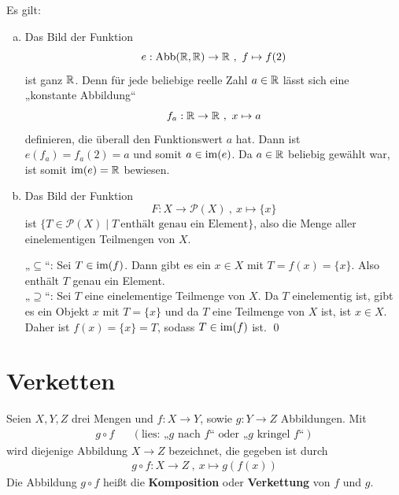 \begin{bsp} \label{bildbsp}
 Es gilt:
 \begin{enumerate}[a)]
  \item Das Bild der Funktion
\[   e : \text{Abb}({\mathbb R},{\mathbb R}) \to {\mathbb R} \ ,\ f \mapsto f(2) \]
ist ganz ${\mathbb R}$. Denn für jede beliebige reelle Zahl $a\in {\mathbb R}$ lässt sich eine „konstante Abbildung“
\[ f_a : {\mathbb R} \to {\mathbb R} \ ,\  x\mapsto a \]
definieren, die überall den Funktionswert $a$ hat. Dann ist $e(f_a)=f_a(2)=a$ und somit $a\in \operatorname{im}(e)$. Da $a\in {\mathbb R}$ beliebig gewählt war, ist somit $\operatorname{im}(e)={\mathbb R}$ bewiesen.
\item Das Bild der Funktion
\[ F: X \to \mathcal{P}(X) \ ,\ x \mapsto \{x\} \]
ist $\{T\in\mathcal{P}(X)\mid T\ \text{enthält genau ein Element} \}$, also die Menge aller einelementigen Teilmengen von $X$.
\begin{bew}
 „$\subseteq$“: Sei $T\in \operatorname{im}(f)$. Dann gibt es ein $x\in X$ mit $T=f(x)=\{x\}$. Also enthält $T$ genau ein Element. \\
 „$\supseteq$“: Sei $T$ eine einelementige Teilmenge von $X$. Da $T$ einelementig ist, gibt es ein Objekt $x$ mit $T=\{x\}$ und da $T$ eine Teilmenge von $X$ ist, ist $x\in X$. Daher ist $f(x)=\{x\}=T$, sodass $T\in \operatorname{im}(f)$ ist. \qed
\end{bew}
\end{enumerate}

\end{bsp}









\section{Verketten}
\begin{de}\label{verkettung}
	Seien $X,Y,Z$ drei Mengen und $f: X \to Y$, sowie $g: Y \to Z$
	Abbildungen. Mit
	\begin{align*}
	 g\circ f && (\text{lies: „$g$ nach $f$“ oder „$g$ kringel $f$“})
	\end{align*} wird diejenige Abbildung $X\to Z$ bezeichnet, die gegeben ist durch
	\begin{align*}
		g \circ f: X \to Z \ ,\ x \mapsto g(f(x))
	\end{align*}
    Die Abbildung $g\circ f$ heißt die \textbf{Komposition} oder
	\textbf{Verkettung} von $f$ und $g$.
\end{de}



